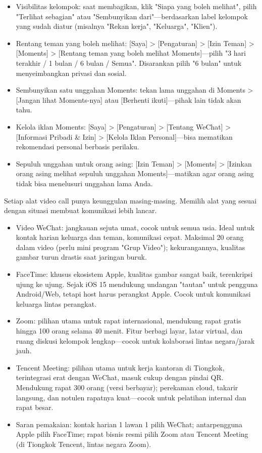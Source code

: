 
\begin{itemize}
  \item Visibilitas kelompok: saat membagikan, klik "Siapa yang boleh melihat", pilih "Terlihat sebagian" atau "Sembunyikan dari"—berdasarkan label kelompok yang sudah diatur (misalnya "Rekan kerja", "Keluarga", "Klien").
  \item Rentang teman yang boleh melihat: [Saya] > [Pengaturan] > [Izin Teman] > [Moments] > [Rentang teman yang boleh melihat Moments]—pilih "3 hari terakhir / 1 bulan / 6 bulan / Semua". Disarankan pilih "6 bulan" untuk menyeimbangkan privasi dan sosial.
  \item Sembunyikan satu unggahan Moments: tekan lama unggahan di Moments > [Jangan lihat Moments-nya] atau [Berhenti ikuti]—pihak lain tidak akan tahu.
  \item Kelola iklan Moments: [Saya] > [Pengaturan] > [Tentang WeChat] > [Informasi Pribadi \& Izin] > [Kelola Iklan Personal]—bisa mematikan rekomendasi personal berbasis perilaku.
  \item Sepuluh unggahan untuk orang asing: [Izin Teman] > [Moments] > [Izinkan orang asing melihat sepuluh unggahan Moments]—matikan agar orang asing tidak bisa menelusuri unggahan lama Anda.
\end{itemize}


Setiap alat video call punya keunggulan masing-masing. Memilih alat yang sesuai dengan situasi membuat komunikasi lebih lancar.

\begin{itemize}
  \item Video WeChat: jangkauan sejuta umat, cocok untuk semua usia. Ideal untuk kontak harian keluarga dan teman, komunikasi cepat. Maksimal 20 orang dalam video (perlu mini program "Grup Video"); kekurangannya, kualitas gambar turun drastis saat jaringan buruk.
  \item FaceTime: khusus ekosistem Apple, kualitas gambar sangat baik, terenkripsi ujung ke ujung. Sejak iOS 15 mendukung undangan "tautan" untuk pengguna Android/Web, tetapi host harus perangkat Apple. Cocok untuk komunikasi keluarga lintas perangkat.
  \item Zoom: pilihan utama untuk rapat internasional, mendukung rapat gratis hingga 100 orang selama 40 menit. Fitur berbagi layar, latar virtual, dan ruang diskusi kelompok lengkap—cocok untuk kolaborasi lintas negara/jarak jauh.
  \item Tencent Meeting: pilihan utama untuk kerja kantoran di Tiongkok, terintegrasi erat dengan WeChat, masuk cukup dengan pindai QR. Mendukung rapat 300 orang (versi berbayar); perekaman cloud, takarir langsung, dan notulen rapatnya kuat—cocok untuk pelatihan internal dan rapat besar.
  \item Saran pemakaian: kontak harian 1 lawan 1 pilih WeChat; antarpengguna Apple pilih FaceTime; rapat bisnis resmi pilih Zoom atau Tencent Meeting (di Tiongkok Tencent, lintas negara Zoom).
\end{itemize}

